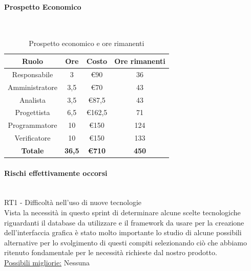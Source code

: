 \documentclass{article}
\begin{document}
                \paragraph{Prospetto Economico}\mbox{}\\
                \begin{table}[H]
                    \centering
                    \begin{tabular}{|c|c|c|c|}
                    \hline
                    \textbf{Ruolo}  & \textbf{Ore}  & \textbf{Costo} & \textbf{Ore rimanenti} \\ \hline
                    Responsabile    & 3             & €90            & 36                     \\ \hline
                    Amministratore  & 3,5           & €70            & 43                   \\ \hline
                    Analista        & 3,5           & €87,5          & 43                   \\ \hline
                    Progettista     & 6,5           & €162,5         & 71                   \\ \hline
                    Programmatore   & 10            & €150           & 124                    \\ \hline
                    Verificatore    & 10            & €150           & 133                    \\ \hline
                    \textbf{Totale} & \textbf{36,5} & \textbf{\euro710}   & \textbf{450}         \\ \hline
                    \end{tabular}
                    \caption{Prospetto economico e ore rimanenti}
                \end{table}


                \paragraph{Rischi effettivamente occorsi}\mbox{}\\
                RT1 - Difficoltà nell’uso di nuove tecnologie \\
                Vista la necessità in questo sprint di determinare alcune scelte tecnologiche riguardanti il database da utilizzare e il framework da usare per la creazione dell’interfaccia grafica è stato molto importante lo studio di alcune possibili alternative per lo svolgimento di questi compiti selezionando ciò che abbiamo ritenuto fondamentale per le necessità richieste dal nostro prodotto. \\
                \underline{Possibili migliorie:} Nessuna
\end{document}
